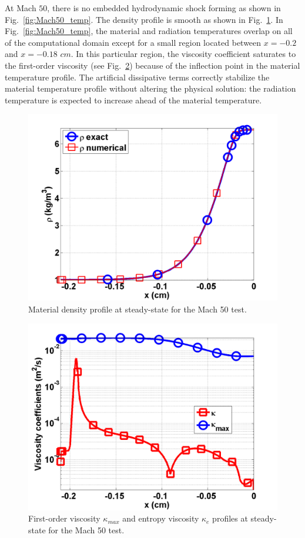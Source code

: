 \documentclass[review]{elsarticle}
\newcommand{\fig}[1]{Fig.~\ref{#1}}                      %
\begin{document}
At Mach $50$, there is no embedded hydrodynamic shock forming as shown in \fig{fig:Mach50_temp}. The density profile is smooth as shown in \fig{fig:Mach50_density}. In \fig{fig:Mach50_temp}, the material and radiation temperatures overlap on all of the computational domain except for a small region located between $x=-0.2$ and $x=-0.18$ $cm$. In this particular region, the viscosity coefficient saturates to the first-order viscosity (see \fig{fig:Mach50_viscosity}) because of the inflection point in the material temperature profile. The artificial dissipative terms correctly stabilize the material temperature profile without altering the physical solution: the radiation temperature is expected to increase ahead of the material temperature.
\begin{figure}[H]
                \centering
                \includegraphics[width=\textwidth]{figs/Mach_50_nel_1000_density.png}
        \caption{Material density profile at steady-state for the Mach 50 test.}\label{fig:Mach50_density}
\end{figure}
\begin{figure}[H]
                \centering
                \includegraphics[width=\textwidth]{figs/Mach_50_nel_1000_viscosity.png}
        \caption{First-order viscosity $\kappa_{max}$ and entropy viscosity $\kappa_e$ profiles at steady-state for the Mach 50 test.}\label{fig:Mach50_viscosity}
\end{figure}
\end{document}

